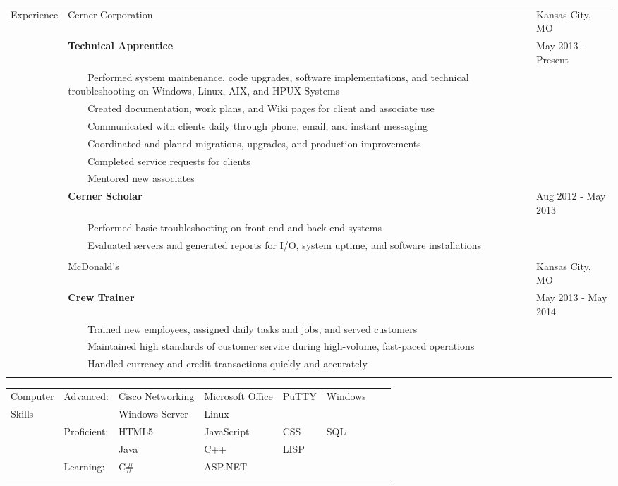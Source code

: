 \documentclass[12pt, arial]{article}
\newcommand{\tabitem}{~~\llap{\textbullet}~~}
\begin{document}
\begin{tabular}{p{1.9cm} p{12.9cm} l}
Experience  & Cerner Corporation												& Kansas City, MO 		\\
			& \textbf{Technical Apprentice} 									& May 2013 - Present	\\
			& \tabitem Performed system maintenance, code upgrades, software implementations, and technical troubleshooting on Windows, Linux, AIX, and HPUX Systems & 				\\
			& \tabitem Created documentation, work plans, and Wiki pages for client and associate use &	\\ 
			& \tabitem Communicated with clients daily through phone, email, and instant messaging& 		\\
			& \tabitem Coordinated and planed migrations, upgrades, and production improvements& 			\\
			& \tabitem Completed service requests for clients 					&		 				\\
			& \tabitem Mentored new associates									& 						\\


			& \textbf{Cerner Scholar} 											& Aug 2012 - May 2013			\\
			& \tabitem Performed basic troubleshooting on front-end and back-end systems 		& 			\\
			& \tabitem Evaluated servers and generated reports for I/O, system uptime, and software installations & \\ \\

			& McDonald's														& Kansas City, MO 		\\
			& \textbf{Crew Trainer} 											& May 2013 - May 2014 	\\
			& \tabitem Trained new employees, assigned daily tasks and jobs, and served customers	& 	\\ 
			& \tabitem Maintained high standards of customer service during high-volume, fast-paced operations & 						\\
			& \tabitem Handled currency and credit transactions quickly and accurately						&						\\ \\

\end{tabular}

\begin{tabular}{p{1.9cm} l l l l l l l}
Computer	& Advanced: 	& Cisco Networking 		& Microsoft Office 	& PuTTY		& Windows	& 					& 	\\
Skills		& 				& Windows Server 		& Linux				& 			& 			& 					& 	\\
			& Proficient:	& HTML5 				& JavaScript 		& CSS 		& SQL 		& 	   				& 	\\
			& 				& Java					& C++				& LISP 		& 			& 					& 	\\
			& Learning:		& C\# 					& ASP.NET 			& 			& 			& 					& 	\\ \\
\end{tabular}
\end{document}
